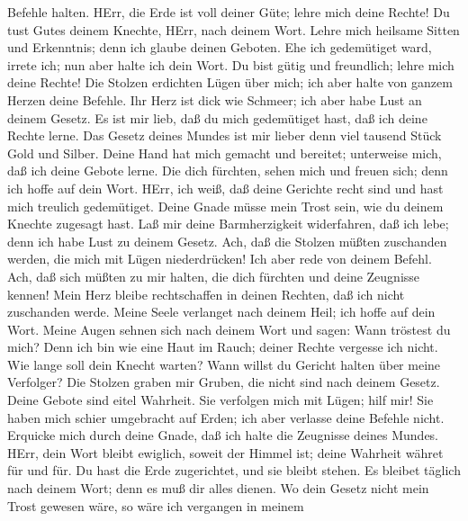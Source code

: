 Befehle halten.  HErr, die Erde ist voll deiner Güte; lehre
mich deine Rechte!  Du tust Gutes deinem Knechte, HErr,
nach deinem Wort.  Lehre mich heilsame Sitten und
Erkenntnis; denn ich glaube deinen Geboten.  Ehe ich
gedemütiget ward, irrete ich; nun aber halte ich dein Wort.
 Du bist gütig und freundlich; lehre mich deine Rechte!
 Die Stolzen erdichten Lügen über mich; ich aber halte von
ganzem Herzen deine Befehle.  Ihr Herz ist dick wie
Schmeer; ich aber habe Lust an deinem Gesetz.  Es ist mir
lieb, daß du mich gedemütiget hast, daß ich deine Rechte lerne.
 Das Gesetz deines Mundes ist mir lieber denn viel tausend
Stück Gold und Silber.  Deine Hand hat mich gemacht und
bereitet; unterweise mich, daß ich deine Gebote lerne.  Die
dich fürchten, sehen mich und freuen sich; denn ich hoffe auf dein Wort.
 HErr, ich weiß, daß deine Gerichte recht sind und hast
mich treulich gedemütiget.  Deine Gnade müsse mein Trost
sein, wie du deinem Knechte zugesagt hast.  Laß mir deine
Barmherzigkeit widerfahren, daß ich lebe; denn ich habe Lust zu deinem
Gesetz.  Ach, daß die Stolzen müßten zuschanden werden, die
mich mit Lügen niederdrücken! Ich aber rede von deinem Befehl.
 Ach, daß sich müßten zu mir halten, die dich fürchten und
deine Zeugnisse kennen!  Mein Herz bleibe rechtschaffen in
deinen Rechten, daß ich nicht zuschanden werde.  Meine
Seele verlanget nach deinem Heil; ich hoffe auf dein Wort. 
Meine Augen sehnen sich nach deinem Wort und sagen: Wann tröstest du
mich?  Denn ich bin wie eine Haut im Rauch; deiner Rechte
vergesse ich nicht.  Wie lange soll dein Knecht warten?
Wann willst du Gericht halten über meine Verfolger?  Die
Stolzen graben mir Gruben, die nicht sind nach deinem Gesetz.
 Deine Gebote sind eitel Wahrheit. Sie verfolgen mich mit
Lügen; hilf mir!  Sie haben mich schier umgebracht auf
Erden; ich aber verlasse deine Befehle nicht.  Erquicke
mich durch deine Gnade, daß ich halte die Zeugnisse deines Mundes.
 HErr, dein Wort bleibt ewiglich, soweit der Himmel ist;
 deine Wahrheit währet für und für. Du hast die Erde
zugerichtet, und sie bleibt stehen.  Es bleibet täglich
nach deinem Wort; denn es muß dir alles dienen.  Wo dein
Gesetz nicht mein Trost gewesen wäre, so wäre ich vergangen in meinem
